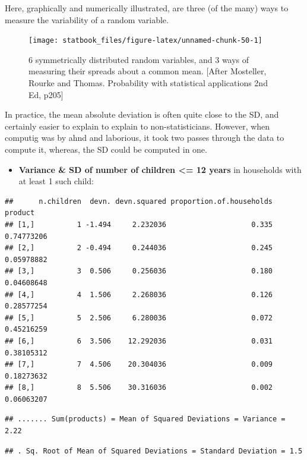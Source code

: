 \documentclass[]{book}
\providecommand{\tightlist}{%
  \setlength{\itemsep}{0pt}\setlength{\parskip}{0pt}}
\begin{document}
Here, graphically and numerically illustrated, are three (of the many) ways to measure the variability of a random variable.

\begin{figure}

{\centering \texttt{[image: statbook\_files/figure-latex/unnamed-chunk-50-1]} 

}

\caption{6 symmetrically distributed random variables, and 3  ways of measuring their spreads about a common mean. [After Mosteller, Rourke and Thomas. Probability with statistical applications 2nd Ed, p205] }\label{fig:unnamed-chunk-50}
\end{figure}

In practice, the mean absolute deviation is often quite close to the SD, and certainly easier to explain to explain to non-statisticians. However, when computig was by ahnd and laborious, it took two passes through the data to compute it, whereas, the SD could be computed in one.

\begin{itemize}
\tightlist
\item
  \textbf{Variance \& SD of number of children \textless{}= 12 years} in households with at least 1 such child:
\end{itemize}

\begin{verbatim}
##      n.children  devn. devn.squared proportion.of.households    product
## [1,]          1 -1.494     2.232036                    0.335 0.74773206
## [2,]          2 -0.494     0.244036                    0.245 0.05978882
## [3,]          3  0.506     0.256036                    0.180 0.04608648
## [4,]          4  1.506     2.268036                    0.126 0.28577254
## [5,]          5  2.506     6.280036                    0.072 0.45216259
## [6,]          6  3.506    12.292036                    0.031 0.38105312
## [7,]          7  4.506    20.304036                    0.009 0.18273632
## [8,]          8  5.506    30.316036                    0.002 0.06063207
\end{verbatim}

\begin{verbatim}
## ....... Sum(products) = Mean of Squared Deviations = Variance = 2.22
\end{verbatim}

\begin{verbatim}
## . Sq. Root of Mean of Squared Deviations = Standard Deviation = 1.5
\end{verbatim}
\end{document}
